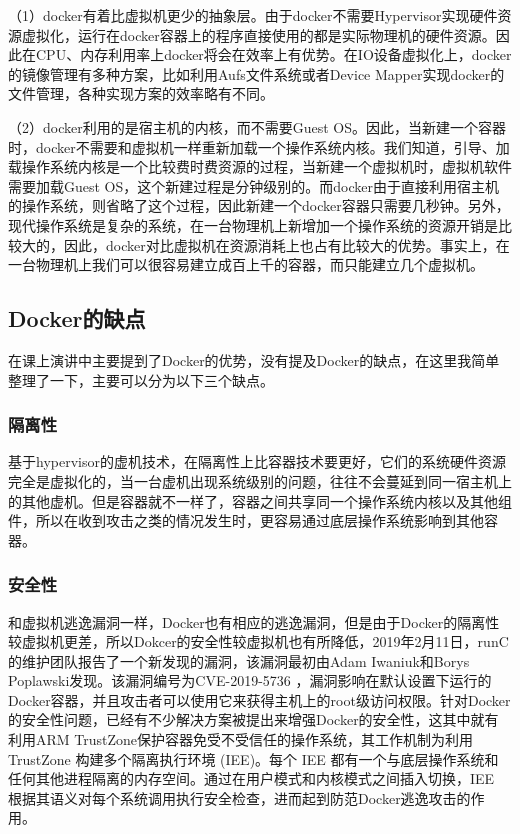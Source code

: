\documentclass{article}
\begin{document}
（1）docker有着比虚拟机更少的抽象层。由于docker不需要Hypervisor实现硬件资源虚拟化，运行在docker容器上的程序直接使用的都是实际物理机的硬件资源。因此在CPU、内存利用率上docker将会在效率上有优势。在IO设备虚拟化上，docker的镜像管理有多种方案，比如利用Aufs文件系统或者Device Mapper实现docker的文件管理，各种实现方案的效率略有不同。
\par

（2）docker利用的是宿主机的内核，而不需要Guest OS。因此，当新建一个容器时，docker不需要和虚拟机一样重新加载一个操作系统内核。我们知道，引导、加载操作系统内核是一个比较费时费资源的过程，当新建一个虚拟机时，虚拟机软件需要加载Guest OS，这个新建过程是分钟级别的。而docker由于直接利用宿主机的操作系统，则省略了这个过程，因此新建一个docker容器只需要几秒钟。另外，现代操作系统是复杂的系统，在一台物理机上新增加一个操作系统的资源开销是比较大的，因此，docker对比虚拟机在资源消耗上也占有比较大的优势。事实上，在一台物理机上我们可以很容易建立成百上千的容器，而只能建立几个虚拟机。

\subsection{Docker的缺点}
在课上演讲中主要提到了Docker的优势，没有提及Docker的缺点，在这里我简单整理了一下，主要可以分为以下三个缺点。

\subsubsection{隔离性}
基于hypervisor的虚机技术，在隔离性上比容器技术要更好，它们的系统硬件资源完全是虚拟化的，当一台虚机出现系统级别的问题，往往不会蔓延到同一宿主机上的其他虚机。但是容器就不一样了，容器之间共享同一个操作系统内核以及其他组件，所以在收到攻击之类的情况发生时，更容易通过底层操作系统影响到其他容器。

\subsubsection{安全性}
和虚拟机逃逸漏洞一样，Docker也有相应的逃逸漏洞，但是由于Docker的隔离性较虚拟机更差，所以Dokcer的安全性较虚拟机也有所降低，2019年2月11日，runC的维护团队报告了一个新发现的漏洞，该漏洞最初由Adam Iwaniuk和Borys Poplawski发现。该漏洞编号为CVE-2019-5736 \citep{CVE}，漏洞影响在默认设置下运行的Docker容器，并且攻击者可以使用它来获得主机上的root级访问权限。针对Docker的安全性问题，已经有不少解决方案被提出来增强Docker的安全性，这其中就有利用ARM TrustZone保护容器免受不受信任的操作系统\citep{TZContainer}，其工作机制为利用 TrustZone 构建多个隔离执行环境 (IEE)。每个 IEE 都有一个与底层操作系统和任何其他进程隔离的内存空间。通过在用户模式和内核模式之间插入切换，IEE 根据其语义对每个系统调用执行安全检查，进而起到防范Docker逃逸攻击的作用。
\end{document}

